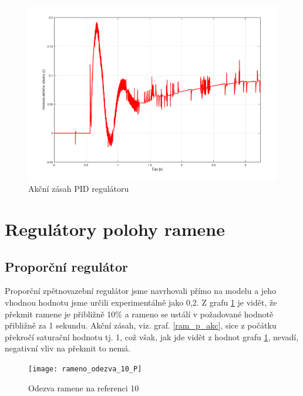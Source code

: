 \documentclass[11pt,a4paper]{article}
\begin{document}
\begin{figure}[H]
	\centering
    \includegraphics[scale=0.55]{odezva_kyvadlo_PID_akcnizasah}
    \caption{Akční zásah PID regulátoru}
\end{figure}


\section{Regulátory polohy ramene}

\subsection{Proporční regulátor}

Proporční zpětnovazební regulátor jsme navrhovali přímo na modelu a jeho vhodnou hodnotu jsme určili experimentálně jako 0,2. Z grafu \ref{ram_p_odz} je vidět, že překmit ramene je přibližně 10\% a rameno se ustálí v požadované hodnotě přibližně za 1 sekundu. Akční zásah, viz. graf. \ref{ram_p_akc}, sice z počátku překročí saturační hodnotu tj. 1, což však, jak jde vidět z hodnot grafu \ref{ram_p_odz}, nevadí, negativní vliv na překmit to nemá.

\begin{figure}[H]
\centering
\texttt{[image: rameno\_odezva\_10\_P]}
\caption{Odezva ramene na referenci 10}
\label{ram_p_odz}
\end{figure}
\end{document}
